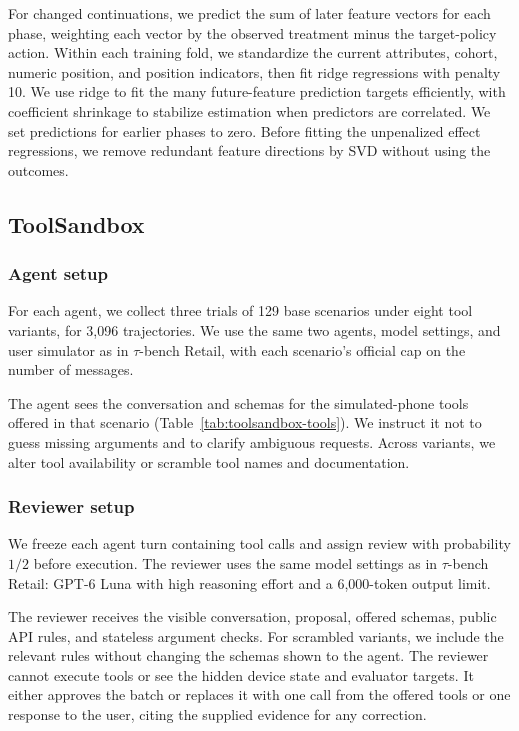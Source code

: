 For changed continuations, we predict the sum of later feature vectors for
each phase, weighting each vector by the observed treatment minus the
target-policy action. Within each training fold, we standardize the current
attributes, cohort, numeric position, and position indicators, then fit
ridge regressions with penalty 10. We use ridge to fit the many
future-feature prediction targets efficiently, with coefficient shrinkage
to stabilize estimation when predictors are correlated. We set predictions for earlier phases to zero. Before fitting the unpenalized effect regressions, we remove redundant feature directions by SVD without using the outcomes.

\subsection{ToolSandbox}
\label{app:toolsandbox-fit}

\subsubsection{Agent setup}
For each agent, we collect three trials of 129 base scenarios under eight tool variants, for 3,096 trajectories. We use the same two agents, model settings, and user simulator as in $\tau$-bench Retail, with each scenario's official cap on the number of messages.

The agent sees the conversation and schemas for the simulated-phone tools offered in that scenario (Table~\ref{tab:toolsandbox-tools}). We instruct it not to guess missing arguments and to clarify ambiguous requests. Across variants, we alter tool availability or scramble tool names and documentation.

\subsubsection{Reviewer setup}
We freeze each agent turn containing tool calls and assign review with
probability $1/2$ before execution.   The reviewer uses the same model settings as in $\tau$-bench Retail: GPT-6 Luna with high reasoning effort and a 6,000-token output limit.


The reviewer receives the visible conversation, proposal, offered schemas, public API rules, and stateless argument checks. For scrambled variants, we include the relevant rules without changing the schemas shown to the agent. The reviewer cannot execute tools or see the hidden device state and evaluator targets. It either approves the batch or replaces it with one call from the offered tools or one response to the user, citing the supplied evidence for any correction.

